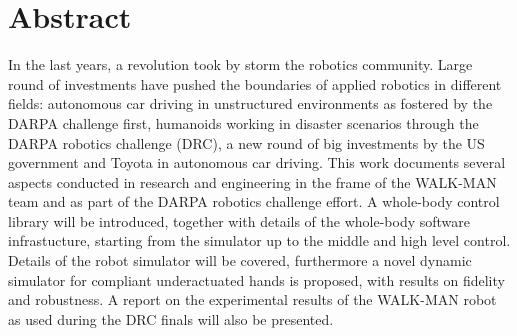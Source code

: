%
\chapter*{Abstract}
\label{sec:abstract}
\vspace*{-10mm}
In the last years, a revolution took by  storm the robotics community. Large round of investments have pushed the boundaries of applied robotics in different fields: autonomous car driving in unstructured environments as fostered by the DARPA challenge first, humanoids working in disaster scenarios through the DARPA robotics challenge (DRC), a new round of big investments by the US government and Toyota in autonomous car driving. This work documents several aspects conducted in research and engineering in the frame of the WALK-MAN team and as part of the DARPA robotics challenge effort. A whole-body control library will be introduced, together with details of the whole-body software infrastucture, starting from the simulator up to the middle and high level control. Details of the robot simulator will be covered, furthermore a novel dynamic simulator for compliant underactuated hands is proposed, with results on fidelity and robustness. A report on the experimental results of the WALK-MAN robot as used during the DRC finals will also be presented.

\vspace*{20mm}


